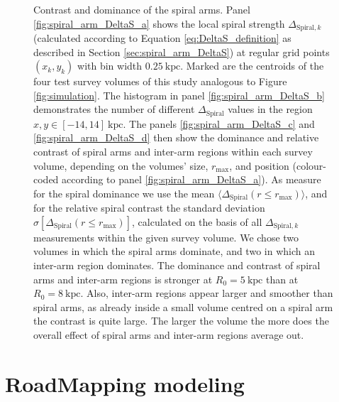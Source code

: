 \documentclass[iop,revtex4,numberedappendix,appendixfloats]{emulateapj}
\newcommand{\hiddenComment}[1]{}
\begin{document}
\begin{figure}[!htbp]
\caption{Contrast and dominance of the spiral arms. Panel \ref{fig:spiral_arm_DeltaS_a} shows the local spiral strength $\Delta_{\text{Spiral},k}$ (calculated according to Equation \eqref{eq:DeltaS_definition} as described in Section \ref{sec:spiral_arm_DeltaS}) at regular grid points $(x_k,y_k)$ with bin width $0.25~\text{kpc}$. Marked are the centroids of the four test survey volumes of this study analogous to Figure \ref{fig:simulation}. The histogram in panel \ref{fig:spiral_arm_DeltaS_b} demonstrates the number of different $\Delta_\text{Spiral}$ values in the region $x,y \in [-14,14]~\text{kpc}$. The panels \ref{fig:spiral_arm_DeltaS_c} and \ref{fig:spiral_arm_DeltaS_d} then show the dominance and relative  contrast of spiral arms and inter-arm regions within each survey volume, depending on the volumes' size, $r_\text{max}$, and position (colour-coded according to panel \ref{fig:spiral_arm_DeltaS_a}). As measure for the spiral dominance we use the mean $\langle \Delta_\text{Spiral} (r \leq r_\text{max}) \rangle$, and for the relative spiral contrast the standard deviation $\sigma[\Delta_\text{Spiral} (r \leq r_\text{max})]$, calculated on the basis of all $\Delta_{\text{Spiral},k}$ measurements within the given survey volume. We chose two volumes in which the spiral arms dominate, and two in which an inter-arm region dominates. The dominance and contrast of spiral arms and inter-arm regions is stronger at $R_0=5~\text{kpc}$ than at $R_0=8~\text{kpc}$. Also, inter-arm regions appear larger and smoother than spiral arms, as already inside a small volume centred on a spiral arm the contrast is quite large. The larger the volume the more does the overall effect of spiral arms and inter-arm regions average out. \hiddenComment{[TO DO: Jo suggested to look into implementing a $\text{sech}^2$ disk for galpy to not have the slight bias in mean($\kappa$) at higher rmax. Maybe it's easy to implement. Maybe it isn't. Reference for sech(z) disk: \url{http://adsabs.harvard.edu/abs/1989MNRAS.239..571K}]}}
\label{fig:spiral_arm_DeltaS}
\end{figure}


\section{RoadMapping modeling} \label{sec:RoadMapping}
\end{document}
